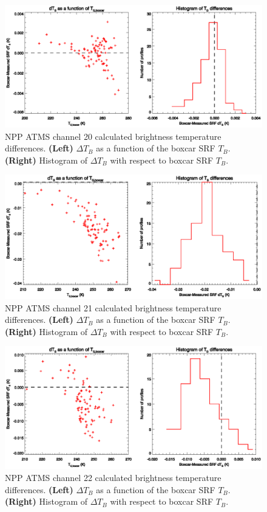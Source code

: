 \begin{figure}[H]
  \centering
  \includegraphics[scale=1]{graphics/dtb/atms_npp.ch20.TbStats.eps}
  \caption{NPP ATMS channel 20 calculated brightness temperature differences. \textbf{(Left)} $\Delta T_B$ as a function of the boxcar SRF $T_B$. \textbf{(Right)} Histogram of $\Delta T_B$ with respect to boxcar SRF $T_B$.}
  \label{fig:atms_npp.ch20.dtb}
\end{figure}

\begin{figure}[H]
  \centering
  \includegraphics[scale=1]{graphics/dtb/atms_npp.ch21.TbStats.eps}
  \caption{NPP ATMS channel 21 calculated brightness temperature differences. \textbf{(Left)} $\Delta T_B$ as a function of the boxcar SRF $T_B$. \textbf{(Right)} Histogram of $\Delta T_B$ with respect to boxcar SRF $T_B$.}
  \label{fig:atms_npp.ch21.dtb}
\end{figure}

\begin{figure}[H]
  \centering
  \includegraphics[scale=1]{graphics/dtb/atms_npp.ch22.TbStats.eps}
  \caption{NPP ATMS channel 22 calculated brightness temperature differences. \textbf{(Left)} $\Delta T_B$ as a function of the boxcar SRF $T_B$. \textbf{(Right)} Histogram of $\Delta T_B$ with respect to boxcar SRF $T_B$.}
  \label{fig:atms_npp.ch22.dtb}
\end{figure}
